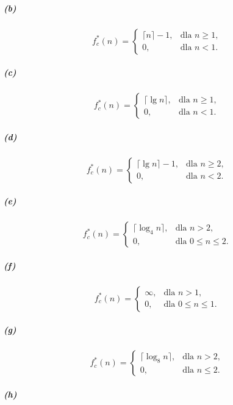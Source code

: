 \subparagraph{(b)}
\[
  f_c^*(n)=\left\{\begin{array}{ll}
	\lceil n\rceil-1, & \mbox{dla }n\ge 1, \\
	0, & \mbox{dla }n<1.
  \end{array}\right.
\]

\subparagraph{(c)}
\[
  f_c^*(n)=\left\{\begin{array}{ll}
	\lceil\lg n\rceil, & \mbox{dla }n\ge 1, \\
	0, & \mbox{dla }n<1.
  \end{array}\right.
\]

\subparagraph{(d)}
\[
  f_c^*(n)=\left\{\begin{array}{ll}
	\lceil\lg n\rceil-1, & \mbox{dla }n\ge 2, \\
	0, & \mbox{dla }n<2.
  \end{array}\right.
\]

\subparagraph{(e)}
\[
  f_c^*(n)=\left\{\begin{array}{ll}
	\lceil\log_4 n\rceil, & \mbox{dla }n>2, \\
	0, & \mbox{dla }0\le n\le 2.
  \end{array}\right.
\]

\subparagraph{(f)}
\[
  f_c^*(n)=\left\{\begin{array}{ll}
	\infty, & \mbox{dla }n>1, \\
	0, & \mbox{dla }0\le n\le 1.
  \end{array}\right.
\]

\subparagraph{(g)}
\[
  f_c^*(n)=\left\{\begin{array}{ll}
	\lceil\log_8 n\rceil, & \mbox{dla }n>2, \\
	0, & \mbox{dla }n\le 2.
  \end{array}\right.
\]

\subparagraph{(h)}
